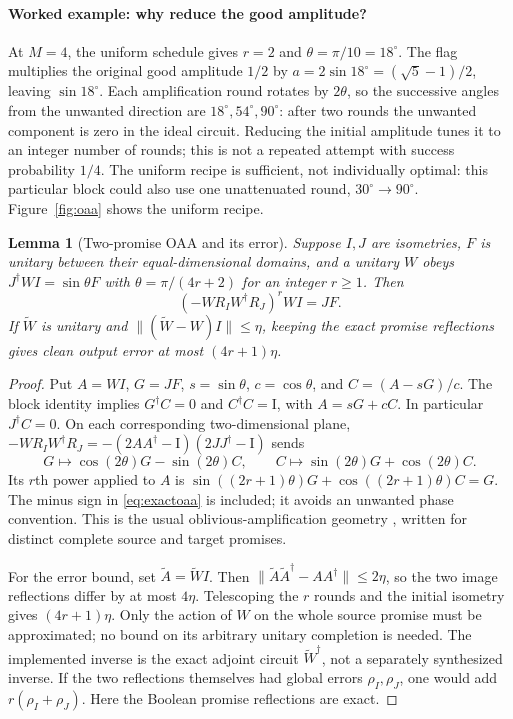 \documentclass[11pt]{article}
\newtheorem{lemma}[theorem]{Lemma}
\theoremstyle{definition}
\newcommand{\norm}[1]{\lVert #1\rVert}
\newcommand{\Id}{\mathrm I}
\begin{document}
\paragraph{Worked example: why reduce the good amplitude?}
At $M=4$, the uniform schedule gives $r=2$ and $\theta=\pi/10=18^\circ$.
The flag multiplies the original good amplitude $1/2$ by
$a=2\sin18^\circ=(\sqrt5-1)/2$, leaving $\sin18^\circ$.
Each amplification round rotates by $2\theta$, so the successive angles
from the unwanted direction are $18^\circ,54^\circ,90^\circ$:
after two rounds the unwanted component is zero in the ideal circuit.
Reducing the initial amplitude tunes it to an integer number of rounds;
this is not a repeated attempt with success probability $1/4$.
The uniform recipe is sufficient, not individually optimal: this
particular block could also use one unattenuated round,
$30^\circ\to90^\circ$. Figure~\ref{fig:oaa} shows the uniform recipe.

\begin{lemma}[Two-promise OAA and its error]\label{lem:oaa}
Suppose $I,J$ are isometries, $F$ is unitary between their equal-dimensional
domains, and a unitary $W$ obeys $J^\dagger WI=\sin\theta F$ with
$\theta=\pi/(4r+2)$ for an integer $r\ge1$. Then
\begin{equation}\label{eq:exactoaa}
 (-WR_IW^\dagger R_J)^r WI=JF.
\end{equation}
If $\widetilde W$ is unitary and
$\norm{(\widetilde W-W)I}\le\eta$, keeping the exact promise reflections
gives clean output error at most $(4r+1)\eta$.
\end{lemma}

\begin{proof}
Put $A=WI$, $G=JF$, $s=\sin\theta$, $c=\cos\theta$, and
$C=(A-sG)/c$. The block identity implies $G^\dagger C=0$ and
$C^\dagger C=\Id$, with $A=sG+cC$. In particular $J^\dagger C=0$.
On each corresponding two-dimensional plane,
$-WR_IW^\dagger R_J=-(2AA^\dagger-\Id)(2JJ^\dagger-\Id)$ sends
\[
 G\mapsto\cos(2\theta)G-\sin(2\theta)C,\qquad
 C\mapsto\sin(2\theta)G+\cos(2\theta)C.
\]
Its $r$th power applied to $A$ is
$\sin((2r+1)\theta)G+\cos((2r+1)\theta)C=G$.
The minus sign in \eqref{eq:exactoaa} is included; it avoids an unwanted
phase convention. This is the usual oblivious-amplification geometry
\cite{oaa}, written for distinct complete source and target promises.

For the error bound, set $\widetilde A=\widetilde W I$. Then
$\norm{\widetilde A\widetilde A^\dagger-AA^\dagger}\le2\eta$,
so the two image reflections differ by at most $4\eta$. Telescoping
the $r$ rounds and the initial isometry gives $(4r+1)\eta$.
Only the action of $W$ on the whole source promise must be approximated;
no bound on its arbitrary unitary completion is needed. The implemented
inverse is the exact adjoint circuit $\widetilde W^\dagger$, not a
separately synthesized inverse. If the two reflections themselves had
global errors $\rho_I,\rho_J$, one would add $r(\rho_I+\rho_J)$.
Here the Boolean promise reflections are exact.
\end{proof}
\end{document}
